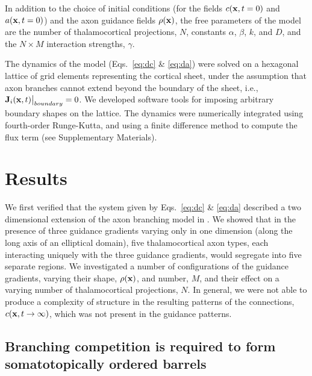 \documentclass[9pt,twocolumn,twoside,lineno]{pnas-new}
\begin{document}
In addition to the choice of initial conditions (for the fields
$c(\mathbf{x},t=0)$ and $a(\mathbf{x},t=0)$) and the axon guidance fields
$\rho(\mathbf{x})$, the free parameters of the model are the number of
thalamocortical projections, $N$, constants $\alpha$, $\beta$, $k$, and $D$,
and the $N\times M$ interaction strengths, $\gamma$.

The dynamics of the model (Eqs.~\ref{eq:dc} \& \ref{eq:da}) were solved on a
hexagonal lattice of grid elements representing the cortical sheet, under the
assumption that axon branches cannot extend beyond the boundary of the sheet,
i.e., $\mathbf{J}_i(\mathbf{x},t) \big\rvert_{boundary} = 0$. We developed software
tools for imposing arbitrary boundary shapes on the lattice. The dynamics were
numerically integrated using fourth-order Runge-Kutta, and using a
{\color{red} finite difference method} to compute the flux term (see
Supplementary Materials).

\section*{Results}


We first verified that the system given by Eqs.~\ref{eq:dc} \& \ref{eq:da}
described a two dimensional extension of the axon branching model in
\cite{karbowski_model_2004}. We showed that in the presence of three guidance
gradients varying only in one dimension (along the long axis of an elliptical
domain), five thalamocortical axon types, each interacting uniquely with the
three guidance gradients, would segregate into five separate regions. We
investigated a number of configurations of the guidance gradients, varying
their shape, $\rho(\mathbf{x})$, and number, $M$, and their effect on a varying
number of thalamocortical projections, $N$. In general, we were not able to
produce a complexity of structure in the resulting patterns of the
connections, $c(\mathbf{x},t\rightarrow\infty)$, which was not present in the
guidance patterns.


\subsection*{Branching competition is required to form somatotopically ordered barrels}
\end{document}
